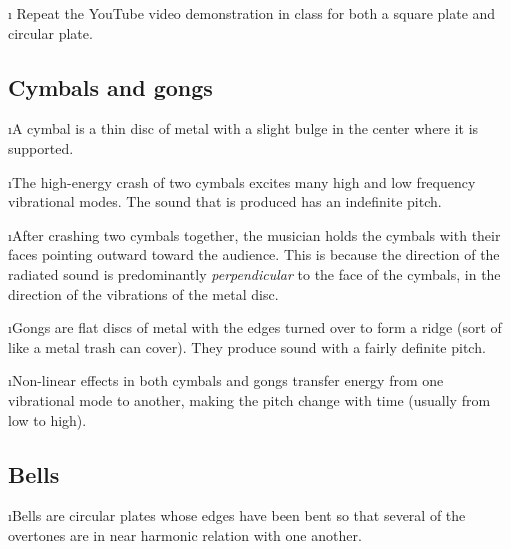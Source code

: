 \i \demo
Repeat the YouTube video demonstration in class for 
both a square plate and circular plate.

\ei
\subsection{Cymbals and gongs}
\bi

\i A cymbal is a thin disc of metal with a slight 
bulge in the center where it is supported.

\i The high-energy crash of two cymbals excites many
high and low frequency vibrational modes.
The sound that is produced has an indefinite pitch.

\i After crashing two cymbals together, the musician
holds the cymbals with their faces pointing outward
toward the audience.  
This is because the direction of the radiated sound 
is predominantly {\em perpendicular}
to the face of the cymbals, in the direction of the
vibrations of the metal disc.

\i Gongs are flat discs of metal with the edges 
turned over to form a ridge (sort of like a metal 
trash can cover).
They produce sound with a fairly definite pitch.

\i Non-linear effects in both cymbals and gongs transfer 
energy from one vibrational mode to another, making the 
pitch change with time (usually from low to high).

\ei
\subsection{Bells}
\bi

\i Bells are circular plates whose edges have 
been bent so that several of the overtones are in near
harmonic relation with one another.

